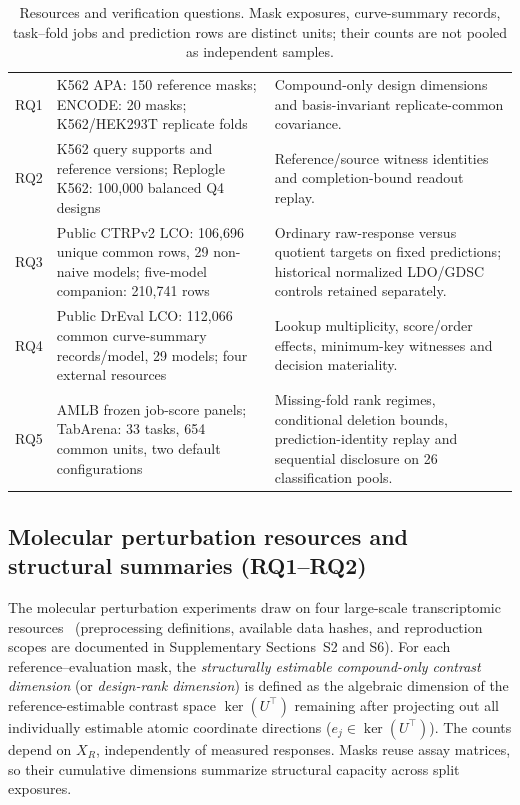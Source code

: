 \documentclass[preprint,12pt,number,sort&compress]{elsarticle}
\begin{document}
\begin{table}[t]
\centering\small{}
\caption{Resources and verification questions. Mask exposures, curve-summary records, task--fold jobs and prediction rows are distinct units; their counts are not pooled as independent samples.}
\label{tab:resources}
\begin{tabularx}{\textwidth}{@{}L{0.10\textwidth}L{0.44\textwidth}X@{}}
\toprule
{} &  & \\\midrule
RQ1 & K562 APA: 150 reference masks; ENCODE: 20 masks; K562/HEK293T replicate folds & Compound-only design dimensions and basis-invariant replicate-common covariance.\\
RQ2 & K562 query supports and reference versions; Replogle K562: 100,000 balanced Q4 designs & Reference/source witness identities and completion-bound readout replay.\\
RQ3 & Public CTRPv2 LCO: 106,696 unique common rows, 29 non-naive models; five-model companion: 210,741 rows & Ordinary raw-response versus quotient targets on fixed predictions; historical normalized LDO/GDSC controls retained separately.\\
RQ4 & Public DrEval LCO: 112,066 common curve-summary records/model, 29 models; four external resources & Lookup multiplicity, score/order effects, minimum-key witnesses and decision materiality.\\
RQ5 & AMLB frozen job-score panels; TabArena: 33 tasks, 654 common units, two default configurations & Missing-fold rank regimes, conditional deletion bounds, prediction-identity replay and sequential disclosure on 26 classification pools.\\\bottomrule
\end{tabularx}
\end{table}

\subsection{Molecular perturbation resources and structural summaries (RQ1--RQ2)}
The molecular perturbation experiments draw on four large-scale transcriptomic resources~\cite{kowalski2024cpa,vannostrand2020rbp,jagannatha2026rbp,replogle2022perturbseq} (preprocessing definitions, available data hashes, and reproduction scopes are documented in Supplementary Sections~S2 and S6). For each reference--evaluation mask, the \emph{structurally estimable compound-only contrast dimension} (or \emph{design-rank dimension}) is defined as the algebraic dimension of the reference-estimable contrast space $\ker(U^\top)$ remaining after projecting out all individually estimable atomic coordinate directions ($e_j \in \ker(U^\top)$). The counts depend on $X_R$, independently of measured responses. Masks reuse assay matrices, so their cumulative dimensions summarize structural capacity across split exposures.
\end{document}

